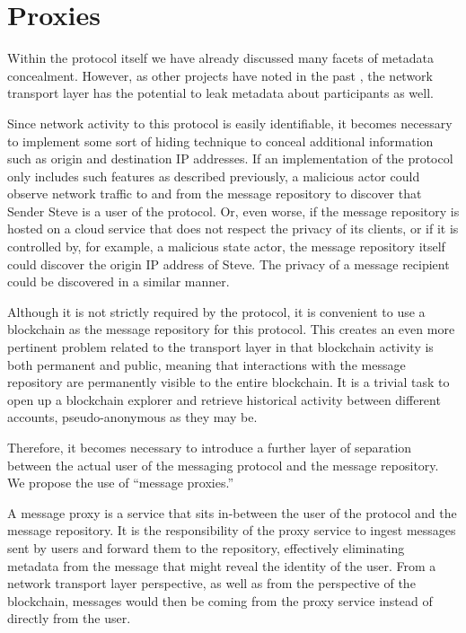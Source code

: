 \section{Proxies }\label{proxies}

Within the protocol itself we have already discussed many facets of metadata concealment. However, as other projects have noted in the past \parencite{erciccione_blog_2020, dingledine_tor_2004}, the network transport layer has the potential to leak metadata about participants as well.

Since network activity to this protocol is easily identifiable, it becomes necessary to implement some sort of hiding technique to conceal additional information such as origin and destination IP addresses. If an implementation of the protocol only includes such features as described previously, a malicious actor could observe network traffic to and from the message repository to discover that Sender Steve is a user of the protocol. Or, even worse, if the message repository is hosted on a cloud service that does not respect the privacy of its clients, or if it is controlled by, for example, a malicious state actor, the message repository itself could discover the origin IP address of Steve. The privacy of a message recipient could be discovered in a similar manner.

Although it is not strictly required by the protocol, it is convenient to use a blockchain as the message repository for this protocol. This creates an even more pertinent problem related to the transport layer in that blockchain activity is both permanent and public, meaning that interactions with the message repository are permanently visible to the entire blockchain. It is a trivial task to open up a blockchain explorer and retrieve historical activity between different accounts, pseudo-anonymous as they may be.

Therefore, it becomes necessary to introduce a further layer of separation between the actual user of the messaging protocol and the message repository. We propose the use of ``message proxies.''

A message proxy is a service that sits in-between the user of the protocol and the message repository. It is the responsibility of the proxy service to ingest messages sent by users and forward them to the repository, effectively eliminating metadata from the message that might reveal the identity of the user. From a network transport layer perspective, as well as from the perspective of the blockchain, messages would then be coming from the proxy service instead of directly from the user.

